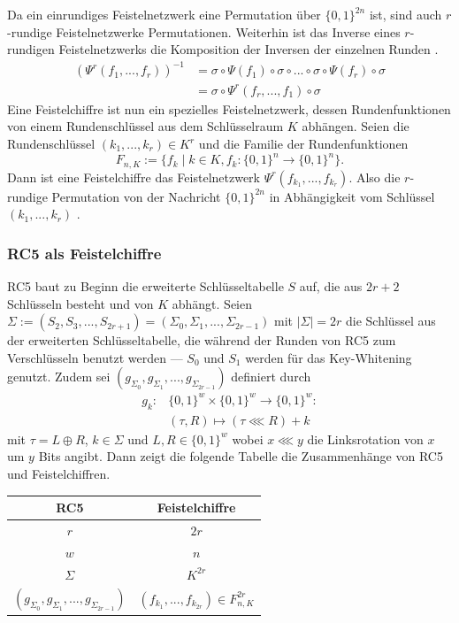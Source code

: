 \documentclass[course=erap]{aspdoc}
\begin{document}
Da ein einrundiges Feistelnetzwerk eine Permutation über $\{0,1\}^{2n}$ ist, sind auch $r$-rundige Feistelnetzwerke Permutationen. Weiterhin ist das Inverse eines $r$-rundigen Feistelnetzwerks die Komposition der Inversen der einzelnen Runden \cite[p.13]{nachef}.
\begin{align*}
    (\Psi^r(f_1, ..., f_r))^{-1} &= \sigma \circ \Psi(f_1) \circ \sigma \circ ... \circ \sigma \circ \Psi(f_r) \circ \sigma \\
                                 &= \sigma \circ \Psi^r(f_r, ..., f_1) \circ \sigma
\end{align*} Eine Feistelchiffre ist nun ein spezielles Feistelnetzwerk, dessen Rundenfunktionen von einem Rundenschlüssel aus dem Schlüsselraum $K$ abhängen.
Seien die Rundenschlüssel $(k_1, ..., k_r) \in K^r$ und die Familie der Rundenfunktionen
\[
    F_{n, K} := \{f_k \mid k \in K, f_k \colon \{0, 1\}^n \to \{0, 1\}^n\}.
\]
Dann ist eine Feistelchiffre das Feistelnetzwerk $\Psi^r(f_{k_1},...,f_{k_r})$. Also die $r$-rundige Permutation von der Nachricht $\{0, 1\}^{2n}$ in Abhängigkeit vom Schlüssel $(k_1, ..., k_r)$ \cite[p.14]{nachef}.

\subsubsection{RC5 als Feistelchiffre}

RC5 baut zu Beginn die erweiterte Schlüsseltabelle $S$ auf, die aus $2r + 2$ Schlüsseln besteht und von $K$ abhängt. Seien $\Sigma := (S_2, S_3, ..., S_{2r+1}) = (\Sigma_0, \Sigma_1, ..., \Sigma_{2r-1})$ mit $|\Sigma| = 2r$ die Schlüssel aus der erweiterten Schlüsseltabelle, die während der Runden von RC5 zum Verschlüsseln benutzt werden --- $S_0$ und $S_1$ werden für das Key-Whitening genutzt. Zudem sei $(g_{\Sigma_0}, g_{\Sigma_1}, ..., g_{\Sigma_{2r-1}})$ definiert durch
\begin{align*}
    g_k \colon &\{0, 1\}^w \times \{0, 1\}^w \to \{0, 1\}^w \colon \\
               &(\tau, R) \mapsto (\tau \lll R) + k
\end{align*}
mit $\tau = L \oplus R$, $k \in \Sigma$ und $L, R \in \{0, 1\}^w$ wobei $x \lll y$ die Linksrotation von $x$ um $y$ Bits angibt. Dann zeigt die folgende Tabelle die Zusammenhänge von RC5 und Feistelchiffren.

\begin{center}
 \begin{tabular}{c|c}
 RC5 & Feistelchiffre \\
 \hline
 $r$ & $2r$ \\
 $w$ & $n$ \\
 $\Sigma$ & $K^{2r}$ \\
 $(g_{\Sigma_0}, g_{\Sigma_1}, ..., g_{\Sigma_{2r-1}})$ & $(f_{k_1}, ..., f_{k_{2r}}) \in F^{2r}_{n, K}$ \\
\end{tabular}
\end{center}
\end{document}
